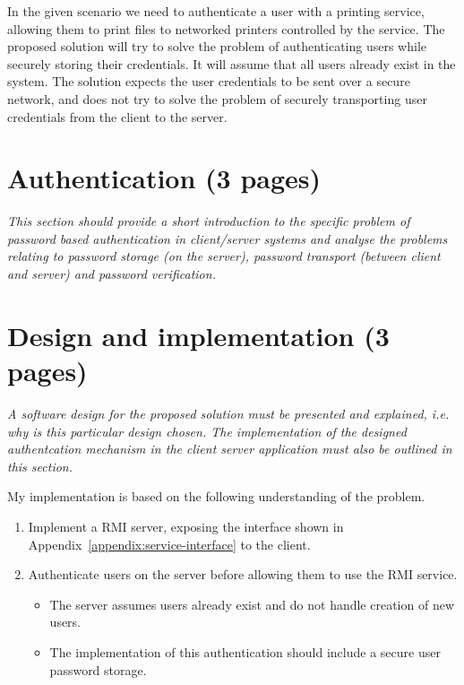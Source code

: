 \documentclass[12pt]{article}
\begin{document}
In the given scenario we need to authenticate a user with a printing service, allowing them to print files to networked printers controlled by the service. The proposed solution will try to solve the problem of authenticating users while securely storing their credentials. It will assume that all users already exist in the system.
The solution expects the user credentials to be sent over a secure network, and does not try to solve the problem of securely transporting user credentials from the client to the server.

\newpage

\section{Authentication (3 pages)}
\label{sec:Authentication}

\textit{This section should provide a short introduction to the specific problem of password based authentication in client/server systems and analyse the problems relating to password storage (on the server), password transport (between client and server) and password verification.}

\newpage

\section{Design and implementation (3 pages)}
\label{sec:Design and implementation}

\textit{A software design for the proposed solution must be presented and explained, i.e. why is this particular design chosen. The implementation of the designed authentcation mechanism in the client server application must also be outlined in this section.}

My implementation is based on the following understanding of the problem.

\begin{enumerate}
    \item Implement a RMI server, exposing the interface shown in Appendix~\ref{appendix:service-interface} to the client.
    \item Authenticate users on the server before allowing them to use the RMI service.
    \begin{itemize}
        \item The server assumes users already exist and do not handle creation of new users.
        \item The implementation of this authentication should include a secure user password storage.
    \end{itemize}
\end{enumerate}
\end{document}
